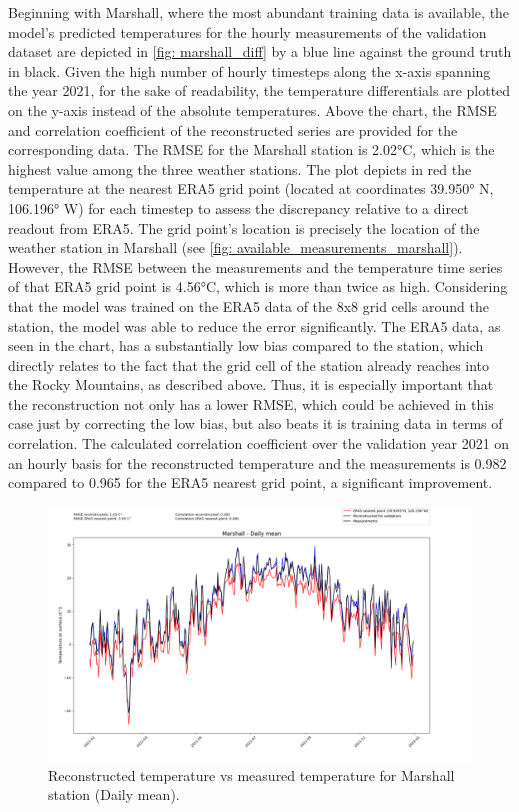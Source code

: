 Beginning with Marshall, where the most abundant training data is available, the model's predicted temperatures for the hourly measurements of the validation dataset are depicted in \autoref{fig: marshall_diff} by a blue line against the ground truth in black.
Given the high number of hourly timesteps along the x-axis spanning the year 2021, for the sake of readability, the temperature differentials are plotted on the y-axis instead of the absolute temperatures.
Above the chart, the RMSE and correlation coefficient of the reconstructed series are provided for the corresponding data.
The RMSE for the Marshall station is 2.02°C, which is the highest value among the three weather stations.
The plot depicts in red the temperature at the nearest ERA5 grid point (located at coordinates 39.950° N, 106.196° W) for each timestep to assess the discrepancy relative to a direct readout from ERA5.
The grid point's location is precisely the location of the weather station in Marshall (see \autoref{fig: available_measurements_marshall}).
However, the RMSE between the measurements and the temperature time series of that ERA5 grid point is 4.56°C, which is more than twice as high.
Considering that the model was trained on the ERA5 data of the 8x8 grid cells around the station, the model was able to reduce the error significantly.
The ERA5 data, as seen in the chart, has a substantially low bias compared to the station, which directly relates to the fact that the grid cell of the station already reaches into the Rocky Mountains, as described above.
Thus, it is especially important that the reconstruction not only has a lower RMSE, which could be achieved in this case just by correcting the low bias, but also beats it is training data in terms of correlation.
The calculated correlation coefficient over the validation year 2021 on an hourly basis for the reconstructed temperature and the measurements is 0.982 compared to 0.965 for the ERA5 nearest grid point, a significant improvement.

\begin{figure}
    \centering
    \includegraphics[width=1.00\textwidth]{resources/images/charts/marshall_eval_grib_final/Marshall - Daily mean.png}
    \caption{Reconstructed temperature vs measured temperature for Marshall station (Daily mean).}
    \label{fig: marshall_daily}
\end{figure}


